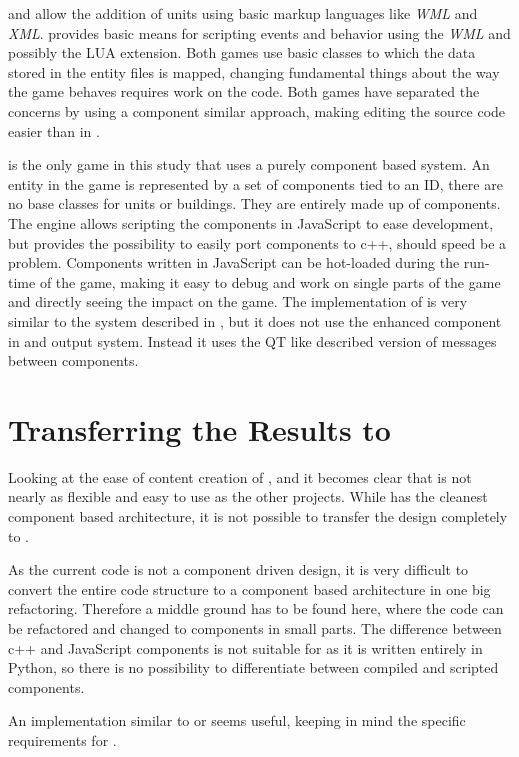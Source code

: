 \BOW{} and \GLEST{} allow the addition of units using basic markup languages like \textit{WML} and \textit{XML}. \BOW{}
provides basic means for scripting events and behavior using the \textit{WML} and possibly the LUA extension. Both
games use basic classes to which the data stored in the entity files is mapped, changing fundamental things about the
way the game behaves requires work on the code. Both games have separated the concerns by using a component similar
approach, making editing the source code easier than in \UH{}.

\AD{} is the only game in this study that uses a purely component based system. An entity in the game is represented by
a set of components tied to an ID, there are no base classes for units or buildings. They are entirely made up of
components. The engine allows scripting the components in JavaScript to ease development, but provides the possibility to
easily port components to c++, should speed be a problem. Components written in JavaScript can be hot-loaded during the run-time
of the game, making it easy to debug and work on single parts of the game and directly seeing the impact on the game.
The implementation of \AD{} is very similar to the system described in \cite{Fh02ageneric}, but it does not use the
enhanced component in and output system. Instead it uses the QT like described version of messages between components.

\section{Transferring the Results to \UH{}}
Looking at the ease of content creation of \BOW{}, \GLEST{} and \AD{} it becomes clear that \UH{} is not nearly as
flexible and easy to use as the other projects. While \AD{} has the cleanest component based architecture, it is not
possible to transfer the design completely to \UH{}. 

As the current code is not a component driven design, it is very difficult to convert the entire code structure to a
component based architecture in one big refactoring. Therefore a middle ground has to be found here, where the code can
be refactored and changed to components in small parts. The difference between c++ and JavaScript components is not suitable
for \UH{} as it is written entirely in Python, so there is no possibility to differentiate between compiled and scripted
components.

An implementation similar to \BOW{} or \GLEST{} seems useful, keeping in mind the specific requirements for \UH{}.

